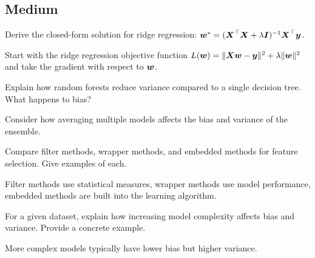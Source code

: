 \subsection*{Medium}

\begin{exercisebox}[medium]
\begin{problem}
\label{prob:ridge-derivation}
Derive the closed-form solution for ridge regression: $\boldsymbol{w}^* = (\boldsymbol{X}^\top \boldsymbol{X} + \lambda \boldsymbol{I})^{-1} \boldsymbol{X}^\top \boldsymbol{y}$.
\end{problem}
\begin{hintbox}
Start with the ridge regression objective function $L(\boldsymbol{w}) = \|\boldsymbol{X}\boldsymbol{w} - \boldsymbol{y}\|^2 + \lambda \|\boldsymbol{w}\|^2$ and take the gradient with respect to $\boldsymbol{w}$.
\end{hintbox}
\end{exercisebox}


\begin{exercisebox}[medium]
\begin{problem}
\label{prob:random-forest-bias-variance}
Explain how random forests reduce variance compared to a single decision tree. What happens to bias?
\end{problem}
\begin{hintbox}
Consider how averaging multiple models affects the bias and variance of the ensemble.
\end{hintbox}
\end{exercisebox}


\begin{exercisebox}[medium]
\begin{problem}
\label{prob:feature-selection}
Compare filter methods, wrapper methods, and embedded methods for feature selection. Give examples of each.
\end{problem}
\begin{hintbox}
Filter methods use statistical measures, wrapper methods use model performance, embedded methods are built into the learning algorithm.
\end{hintbox}
\end{exercisebox}


\begin{exercisebox}[medium]
\begin{problem}
\label{prob:bias-variance}
For a given dataset, explain how increasing model complexity affects bias and variance. Provide a concrete example.
\end{problem}
\begin{hintbox}
More complex models typically have lower bias but higher variance.
\end{hintbox}
\end{exercisebox}


